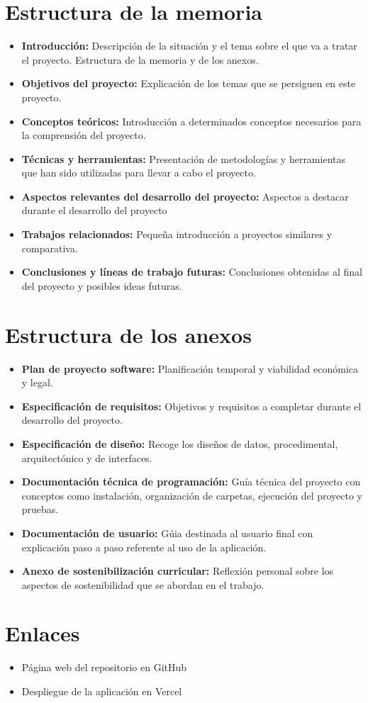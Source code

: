 \section{Estructura de la memoria}
\begin{itemize}
\tightlist
    \item
        \textbf{Introducción: }Descripción de la situación y el tema sobre el que va a tratar el proyecto. Estructura de la memoria y de los anexos.
    \item 
        \textbf{Objetivos del proyecto: }Explicación de los temas que se persiguen en este proyecto.
    \item 
        \textbf{Conceptos teóricos: }Introducción a determinados conceptos necesarios para la comprensión del proyecto.
    \item 
        \textbf{Técnicas y herramientas: }Presentación de metodologías y herramientas que han sido utilizadas para llevar a cabo el proyecto. 
    \item 
        \textbf{Aspectos relevantes del desarrollo del proyecto: }Aspectos a destacar durante el desarrollo del proyecto
    \item 
        \textbf{Trabajos relacionados: } Pequeña introducción a proyectos similares y comparativa.
    \item 
        \textbf{Conclusiones y líneas de trabajo futuras: }Conclusiones obtenidas al final del proyecto y posibles ideas futuras.
\end{itemize}

\section{Estructura de los anexos}
\begin{itemize}
\tightlist
    \item 
        \textbf{Plan de proyecto software: }Planificación temporal y viabilidad económica y legal.
    \item 
        \textbf{Especificación de requisitos: }Objetivos y requisitos a completar durante el desarrollo del proyecto.
    \item 
        \textbf{Especificación de diseño: }Recoge los diseños de datos, procedimental, arquitectónico y de interfaces.
    \item 
        \textbf{Documentación técnica de programación: }Guía técnica del proyecto con conceptos como instalación, organización de carpetas, ejecución del proyecto y pruebas.
    \item 
        \textbf{Documentación de usuario: }Gúia destinada al usuario final con explicación paso a paso referente al uso de la aplicación.
    \item 
        \textbf{Anexo de sostenibilización curricular: }Reflexión personal sobre los aspectos de sostenibilidad que se abordan en el trabajo.
\end{itemize}

\section{Enlaces}
\begin{itemize}
\tightlist
    \item 
        Página web del repositorio en GitHub \cite{draw-er-app:repo}
    \item 
        Despliegue de la aplicación en Vercel \cite{draw-er-app:web}
\end{itemize}

